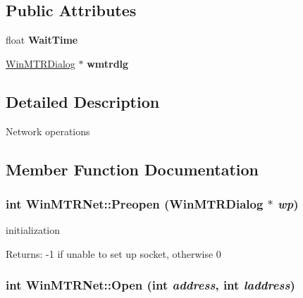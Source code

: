 \subsection*{Public Attributes}
\begin{CompactItemize}
\item 
\hypertarget{classWinMTRNet_8c6600f47b901d17e3c1b755aaf494de}{
float \textbf{WaitTime}}
\label{classWinMTRNet_8c6600f47b901d17e3c1b755aaf494de}

\item 
\hypertarget{classWinMTRNet_19a20d73e232c23259674d095c5437ec}{
\hyperlink{classWinMTRDialog}{WinMTRDialog} $\ast$ \textbf{wmtrdlg}}
\label{classWinMTRNet_19a20d73e232c23259674d095c5437ec}

\end{CompactItemize}


\subsection{Detailed Description}
Network operations 

\subsection{Member Function Documentation}
\hypertarget{classWinMTRNet_ac7beed52d6d2d07cbc139a76ce8e3c2}{
\subsubsection[Preopen]{\setlength{\rightskip}{0pt plus 5cm}int WinMTRNet::Preopen ({\bf WinMTRDialog} $\ast$ {\em wp})}}
\label{classWinMTRNet_ac7beed52d6d2d07cbc139a76ce8e3c2}


initialization \begin{Desc}
\item[Returns:]-1 if unable to set up socket, otherwise 0 \end{Desc}
\hypertarget{classWinMTRNet_98e9dd94f9400ea00c547669a9386fdc}{
\subsubsection[Open]{\setlength{\rightskip}{0pt plus 5cm}int WinMTRNet::Open (int {\em address}, \/  int {\em laddress})}}
\label{classWinMTRNet_98e9dd94f9400ea00c547669a9386fdc}


